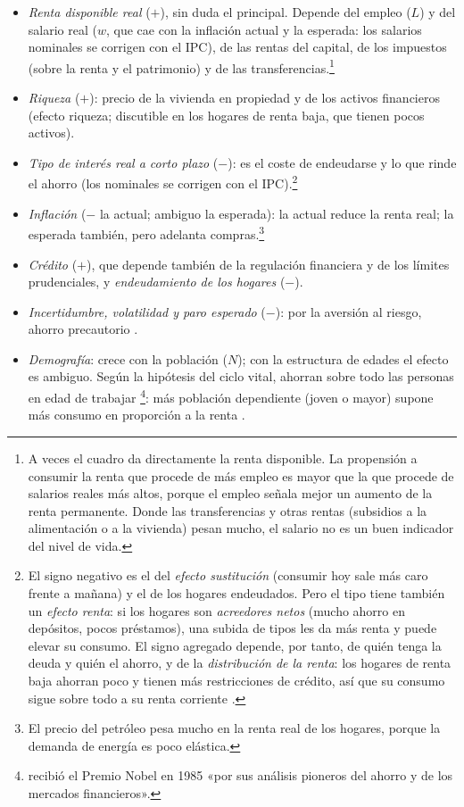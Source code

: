 \documentclass[11pt]{article}
\begin{document}
\begin{itemize}
\begin{itemize}
  \item \emph{Renta disponible real} ($+$), sin duda el principal. Depende del empleo ($L$) y del salario real ($w$, que cae con la inflación actual y la esperada: los salarios nominales se corrigen con el IPC), de las rentas del capital, de los impuestos (sobre la renta y el patrimonio) y de las transferencias.\footnote{A veces el cuadro da directamente la renta disponible. La propensión a consumir la renta que procede de más empleo es mayor que la que procede de salarios reales más altos, porque el empleo señala mejor un aumento de la renta permanente. Donde las transferencias y otras rentas (subsidios a la alimentación o a la vivienda) pesan mucho, el salario no es un buen indicador del nivel de vida.}
  \item \emph{Riqueza} ($+$): precio de la vivienda en propiedad y de los activos financieros (efecto riqueza; discutible en los hogares de renta baja, que tienen pocos activos).
  \item \emph{Tipo de interés real a corto plazo} ($-$): es el coste de endeudarse y lo que rinde el ahorro (los nominales se corrigen con el IPC).\footnote{El signo negativo es el del \emph{efecto sustitución} (consumir hoy sale más caro frente a mañana) y el de los hogares endeudados. Pero el tipo tiene también un \emph{efecto renta}: si los hogares son \emph{acreedores netos} (mucho ahorro en depósitos, pocos préstamos), una subida de tipos les da más renta y puede elevar su consumo. El signo agregado depende, por tanto, de quién tenga la deuda y quién el ahorro, y de la \emph{distribución de la renta}: los hogares de renta baja ahorran poco y tienen más restricciones de crédito, así que su consumo sigue sobre todo a su renta corriente \parencite{FMI2022edXFPP}.}
  \item \emph{Inflación} ($-$ la actual; ambiguo la esperada): la actual reduce la renta real; la esperada también, pero adelanta compras.\footnote{El precio del petróleo pesa mucho en la renta real de los hogares, porque la demanda de energía es poco elástica.}
  \item \emph{Crédito} ($+$), que depende también de la regulación financiera y de los límites prudenciales, y \emph{endeudamiento de los hogares} ($-$).
  \item \emph{Incertidumbre, volatilidad y paro esperado} ($-$): por la aversión al riesgo, ahorro precautorio .
  \item \emph{Demografía}: crece con la población ($N$); con la estructura de edades el efecto es ambiguo. Según la hipótesis del ciclo vital, ahorran sobre todo las personas en edad de trabajar \parencite{ModiglianiBrumberg1954}\footnote{ recibió el Premio Nobel en 1985 «por sus análisis pioneros del ahorro y de los mercados financieros»\nocite{Nobel1985Modigliani}.}: más población dependiente (joven o mayor) supone más consumo en proporción a la renta \parencite{Leff1969Dependencia}.

\end{itemize}
\end{itemize}
\end{document}
